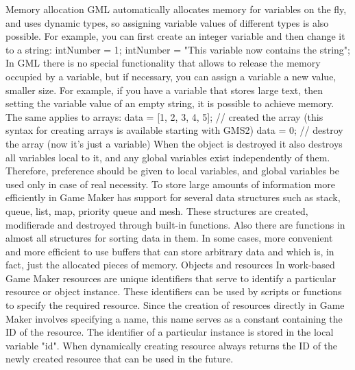 \documentclass[12pt]{article}
\begin{document}
Memory allocation{}
GML automatically allocates memory for variables on the fly, and uses dynamic types, so assigning variable values of different types is also possible. For example, you can first create an integer variable and then change it to a string:
intNumber = 1;
intNumber = "This variable now contains the string";
In GML there is no special functionality that allows to release the memory occupied by a variable, but if necessary, you can assign a variable a new value, smaller size. For example, if you have a variable that stores large text, then setting the variable value of an empty string, it is possible to achieve memory. The same applies to arrays:
data = [1, 2, 3, 4, 5]; // created the array (this syntax for creating arrays is available starting with GMS2)
data = 0; // destroy the array (now it's just a variable)
When the object is destroyed it also destroys all variables local to it, and any global variables exist independently of them. Therefore, preference should be given to local variables, and global variables be used only in case of real necessity. To store large amounts of information more efficiently in Game Maker has support for several data structures such as stack, queue, list, map, priority queue and mesh. These structures are created, modifierade and destroyed through built-in functions. Also there are functions in almost all structures for sorting data in them. In some cases, more convenient and more efficient to use buffers that can store arbitrary data and which is, in fact, just the allocated pieces of memory.
Objects and resources
In work-based Game Maker resources are unique identifiers that serve to identify a particular resource or object instance. These identifiers can be used by scripts or functions to specify the required resource. Since the creation of resources directly in Game Maker involves specifying a name, this name serves as a constant containing the ID of the resource. The identifier of a particular instance is stored in the local variable "id". When dynamically creating resource always returns the ID of the newly created resource that can be used in the future.
\end{document}
